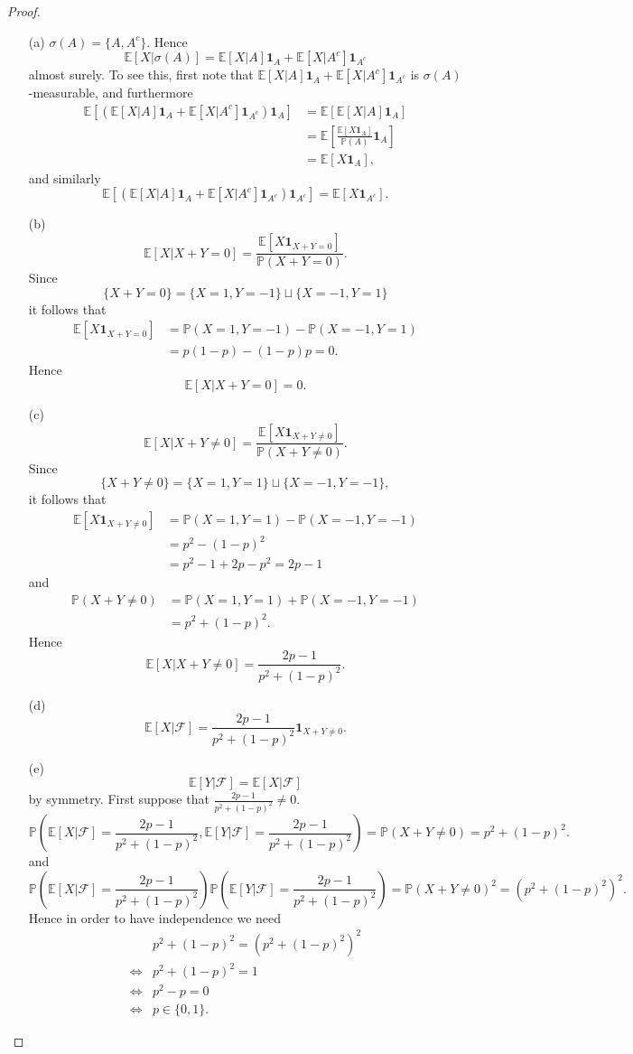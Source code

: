 \documentclass{article}
\begin{document}
\begin{proof}
\begin{enumerate}
    \item[(a)] $\sigma(A)=\{A,A^c\}$. Hence \[\mathbb{E}[X|\sigma(A)]=\mathbb{E}[X|A]\mathbf{1}_A+\mathbb{E}[X|A^c]\mathbf{1}_{A^c}\] almost surely. To see this, first note that $\mathbb{E}[X|A]\mathbf{1}_A+\mathbb{E}[X|A^c]\mathbf{1}_{A^c}$ is $\sigma(A)$-measurable, and furthermore \begin{align*}\mathbb{E}[(\mathbb{E}[X|A]\mathbf{1}_A+\mathbb{E}[X|A^c]\mathbf{1}_{A^c})\mathbf{1}_A]&=\mathbb{E}[\mathbb{E}[X|A]\mathbf{1}_A]\\&=\mathbb{E}\left[\frac{\mathbb{E}[X\mathbf{1}_A]}{\mathbb{P}(A)}\mathbf{1}_A\right]\\&=\mathbb{E}[X\mathbf{1}_A],\end{align*} and similarly \[\mathbb{E}[(\mathbb{E}[X|A]\mathbf{1}_A+\mathbb{E}[X|A^c]\mathbf{1}_{A^c})\mathbf{1}_{A^c}]=\mathbb{E}[X\mathbf{1}_{A^c}].\]
    \item[(b)] \[\mathbb{E}[X|X+Y=0]=\frac{\mathbb{E}[X\mathbf{1}_{X+Y=0}]}{\mathbb{P}(X+Y=0)}.\]Since \[\{X+Y=0\}=\{X=1,Y=-1\}\sqcup\{X=-1,Y=1\}\] it follows that\begin{align*}
    \mathbb{E}[X\mathbf{1}_{X+Y=0}]&=\mathbb{P}(X=1,Y=-1)-\mathbb{P}(X=-1,Y=1)\\&=p(1-p)-(1-p)p=0.
    \end{align*}Hence\[\mathbb{E}[X|X+Y=0]=0.\]
    \item[(c)] \[\mathbb{E}[X|X+Y\neq0]=\frac{\mathbb{E}[X\mathbf{1}_{X+Y\neq0}]}{\mathbb{P}(X+Y\neq0)}.\] Since\[\{X+Y\neq0\}=\{X=1,Y=1\}\sqcup\{X=-1,Y=-1\},\] it follows that\begin{align*}
    \mathbb{E}[X\mathbf{1}_{X+Y\neq0}]&=\mathbb{P}(X=1,Y=1)-\mathbb{P}(X=-1,Y=-1)\\&=p^2-(1-p)^2\\&=p^2-1+2p-p^2=2p-1
    \end{align*}and\begin{align*}
    \mathbb{P}(X+Y\neq0)&=\mathbb{P}(X=1,Y=1)+\mathbb{P}(X=-1,Y=-1)\\&=p^2+(1-p)^2.
    \end{align*}
    Hence\[\mathbb{E}[X|X+Y\neq0]=\frac{2p-1}{p^2+(1-p)^2}.\]
    \item[(d)] \[\mathbb{E}[X|\mathcal{F}]=\frac{2p-1}{p^2+(1-p)^2}\mathbf{1}_{X+Y\neq0}.\]
    \item[(e)] \[\mathbb{E}[Y|\mathcal{F}]=\mathbb{E}[X|\mathcal{F}]\] by symmetry.
    First suppose that $\frac{2p-1}{p^2+(1-p)^2}\neq 0$.\[\mathbb{P}\left(\mathbb{E}[X|\mathcal{F}]=\frac{2p-1}{p^2+(1-p)^2},\mathbb{E}[Y|\mathcal{F}]=\frac{2p-1}{p^2+(1-p)^2}\right)=\mathbb{P}(X+Y\neq0)=p^2+(1-p)^2.\]and\[\mathbb{P}\left(\mathbb{E}[X|\mathcal{F}]=\frac{2p-1}{p^2+(1-p)^2}\right)\mathbb{P}\left(\mathbb{E}[Y|\mathcal{F}]=\frac{2p-1}{p^2+(1-p)^2}\right)=\mathbb{P}(X+Y\neq0)^2=(p^2+(1-p)^2)^2.\] Hence in order to have independence we need\begin{align*}&p^2+(1-p)^2=(p^2+(1-p)^2)^2\\\iff &p^2+(1-p)^2=1\\\iff &p^2-p=0\\\iff &p\in\{0,1\}.\end{align*}

\end{enumerate}
\end{proof}
\end{document}
